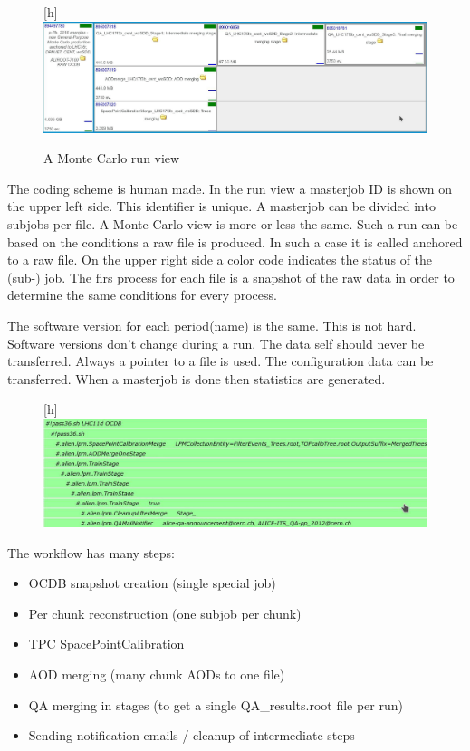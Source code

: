 \begin{figure}
  \begin{center}[h]
    \includegraphics[scale=0.2]{./images/run_view_mc.jpg}
    \caption{A Monte Carlo run view}
    \label{fig:run_view_mc}
  \end{center}
\end{figure}

The coding scheme is human made. In the run view a masterjob ID is shown on the upper left side. This identifier is unique. A masterjob can be divided into subjobs per file. A Monte Carlo view is more or less the same. Such a run can be based on the conditions a raw file is produced. In such a case it is called anchored to a raw file. On the upper right side a color code indicates the status of the (sub-) job. The firs process for each file is a snapshot of the raw data in order to determine the same conditions for every process.

The software version for each period(name) is the same. This is not hard. Software versions don't change during a run. The data self should never be transferred. Always a pointer to a file is used. The configuration data can be transferred. When a masterjob is done then statistics are generated. 

\begin{figure}
  \begin{center}[h]
    \includegraphics[scale=0.25]{./images/workflow.jpg}
    \caption{}
    \label{fig:}
  \end{center}
\end{figure}

The workflow has many steps:
\begin{itemize}
  \item OCDB snapshot creation (single special job)
  \item Per chunk reconstruction (one subjob per chunk)
  \item TPC SpacePointCalibration
  \item AOD merging (many chunk AODs to one file)
  \item QA merging in stages (to get a single QA\_results.root file per run)
  \item Sending notification emails / cleanup of intermediate steps
\end{itemize}

